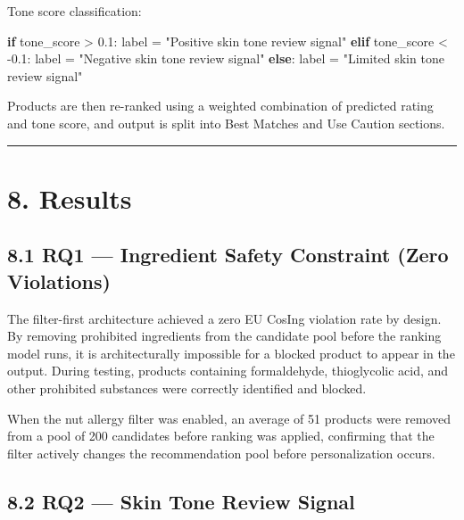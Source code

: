 \documentclass[
  letterpaper,
  DIV=11,
  numbers=noendperiod]{scrartcl}
\newenvironment{Shaded}{\begin{snugshade}}{\end{snugshade}}
\newcommand{\ControlFlowTok}[1]{\textcolor[rgb]{0.00,0.23,0.31}{\textbf{#1}}}
\newcommand{\FloatTok}[1]{\textcolor[rgb]{0.68,0.00,0.00}{#1}}
\newcommand{\NormalTok}[1]{\textcolor[rgb]{0.00,0.23,0.31}{#1}}
\newcommand{\OperatorTok}[1]{\textcolor[rgb]{0.37,0.37,0.37}{#1}}
\newcommand{\StringTok}[1]{\textcolor[rgb]{0.13,0.47,0.30}{#1}}
\begin{document}
Tone score classification:

\protect{}\label{code-tone-label}
\begin{Shaded}
\begin{Highlighting}[]
\ControlFlowTok{if}\NormalTok{ tone\_score }\OperatorTok{\textgreater{}} \FloatTok{0.1}\NormalTok{:}
\NormalTok{    label }\OperatorTok{=} \StringTok{"Positive skin tone review signal"}
\ControlFlowTok{elif}\NormalTok{ tone\_score }\OperatorTok{\textless{}} \OperatorTok{{-}}\FloatTok{0.1}\NormalTok{:}
\NormalTok{    label }\OperatorTok{=} \StringTok{"Negative skin tone review signal"}
\ControlFlowTok{else}\NormalTok{:}
\NormalTok{    label }\OperatorTok{=} \StringTok{"Limited skin tone review signal"}
\end{Highlighting}
\end{Shaded}

Products are then re-ranked using a weighted combination of predicted
rating and tone score, and output is split into Best Matches and Use
Caution sections.

\begin{center}\rule{0.5\linewidth}{0.5pt}\end{center}

\section{8. Results}\label{results}

\subsection{8.1 RQ1 --- Ingredient Safety Constraint (Zero
Violations)}\label{rq1-ingredient-safety-constraint-zero-violations}

The filter-first architecture achieved a zero EU CosIng violation rate
by design. By removing prohibited ingredients from the candidate pool
before the ranking model runs, it is architecturally impossible for a
blocked product to appear in the output. During testing, products
containing formaldehyde, thioglycolic acid, and other prohibited
substances were correctly identified and blocked.

When the nut allergy filter was enabled, an average of 51 products were
removed from a pool of 200 candidates before ranking was applied,
confirming that the filter actively changes the recommendation pool
before personalization occurs.

\subsection{8.2 RQ2 --- Skin Tone Review
Signal}\label{rq2-skin-tone-review-signal}
\end{document}
